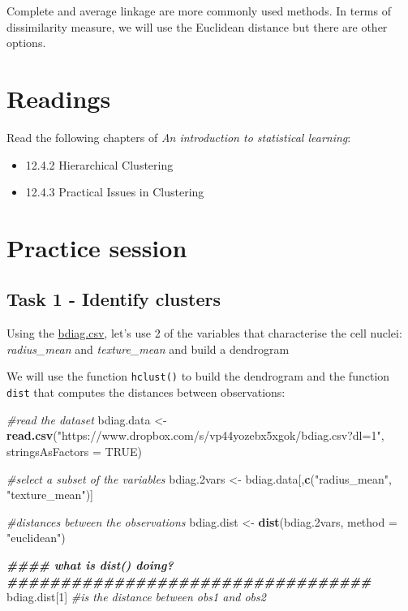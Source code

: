 \documentclass[
]{book}
\newenvironment{Shaded}{\begin{snugshade}}{\end{snugshade}}
\newcommand{\AttributeTok}[1]{\textcolor[rgb]{0.13,0.29,0.53}{#1}}
\newcommand{\CommentTok}[1]{\textcolor[rgb]{0.56,0.35,0.01}{\textit{#1}}}
\newcommand{\ConstantTok}[1]{\textcolor[rgb]{0.56,0.35,0.01}{#1}}
\newcommand{\DecValTok}[1]{\textcolor[rgb]{0.00,0.00,0.81}{#1}}
\newcommand{\DocumentationTok}[1]{\textcolor[rgb]{0.56,0.35,0.01}{\textbf{\textit{#1}}}}
\newcommand{\FloatTok}[1]{\textcolor[rgb]{0.00,0.00,0.81}{#1}}
\newcommand{\FunctionTok}[1]{\textcolor[rgb]{0.13,0.29,0.53}{\textbf{#1}}}
\newcommand{\NormalTok}[1]{#1}
\newcommand{\OtherTok}[1]{\textcolor[rgb]{0.56,0.35,0.01}{#1}}
\newcommand{\StringTok}[1]{\textcolor[rgb]{0.31,0.60,0.02}{#1}}
\begin{document}
Complete and average linkage are more commonly used methods. In terms of
dissimilarity measure, we will use the Euclidean distance but there
are other options.

\section{Readings}\label{HC2}

Read the following chapters of \emph{An introduction to statistical learning}:

\begin{itemize}
\item
  12.4.2 Hierarchical Clustering
\item
  12.4.3 Practical Issues in Clustering
\end{itemize}

\section{Practice session}\label{HC3}

\subsection*{Task 1 - Identify clusters}\label{task-1---identify-clusters}

Using the \href{https://www.dropbox.com/s/vp44yozebx5xgok/bdiag.csv?dl=1}{bdiag.csv},
let's use 2 of the variables that characterise the cell nuclei: \emph{radius\_mean}
and \emph{texture\_mean} and build a dendrogram

We will use the function \texttt{hclust()} to build the dendrogram and the
function \texttt{dist} that computes the distances between observations:

\begin{Shaded}
\begin{Highlighting}[]
\CommentTok{\#read the dataset}
\NormalTok{bdiag.data }\OtherTok{\textless{}{-}} \FunctionTok{read.csv}\NormalTok{(}\StringTok{"https://www.dropbox.com/s/vp44yozebx5xgok/bdiag.csv?dl=1"}\NormalTok{, }
           \AttributeTok{stringsAsFactors =} \ConstantTok{TRUE}\NormalTok{)}

\CommentTok{\#select a subset of the variables}
\NormalTok{bdiag}\FloatTok{.2}\NormalTok{vars }\OtherTok{\textless{}{-}}\NormalTok{ bdiag.data[,}\FunctionTok{c}\NormalTok{(}\StringTok{"radius\_mean"}\NormalTok{, }\StringTok{"texture\_mean"}\NormalTok{)]}


\CommentTok{\#distances between the observations}
\NormalTok{bdiag.dist }\OtherTok{\textless{}{-}} \FunctionTok{dist}\NormalTok{(bdiag}\FloatTok{.2}\NormalTok{vars, }\AttributeTok{method =} \StringTok{"euclidean"}\NormalTok{)}
      
      \DocumentationTok{\#\#\#\# what is dist() doing?\#\#\#\#\#\#\#\#\#\#\#\#\#\#\#\#\#\#\#\#\#\#\#\#\#\#\#\#\#\#\#\#\#\#}
\NormalTok{      bdiag.dist[}\DecValTok{1}\NormalTok{]  }\CommentTok{\#is the distance between obs1 and obs2}
\end{Highlighting}
\end{Shaded}
\end{document}
